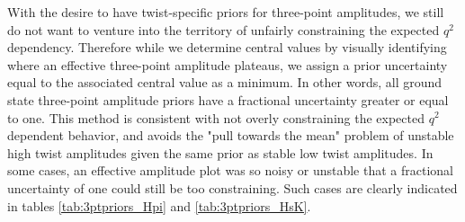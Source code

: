 With the desire to have twist-specific priors for three-point amplitudes, we still do not want to venture into the territory of unfairly constraining the expected $q^2$ dependency.  Therefore while we determine central values by visually identifying where an effective three-point amplitude plateaus, we assign a prior uncertainty equal to the associated central value as a minimum.  In other words, all ground state three-point amplitude priors have a fractional uncertainty greater or equal to one.  This method is consistent with not overly constraining the expected $q^2$ dependent behavior, and avoids the "pull towards the mean" problem of unstable high twist amplitudes given the same prior as stable low twist amplitudes.  In some cases, an effective amplitude plot was so noisy or unstable that a fractional uncertainty of one could still be too constraining.  Such cases are clearly indicated in tables \ref{tab:3ptpriors_Hpi} and \ref{tab:3ptpriors_HsK}.





